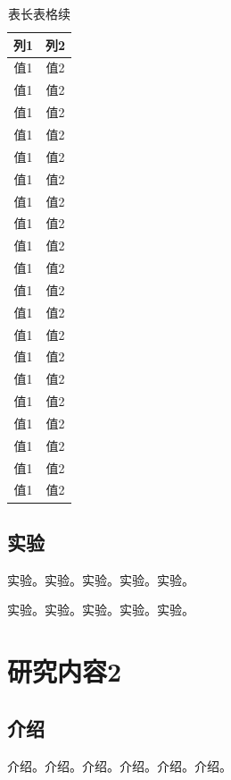 \documentclass{csuthesis}
\begin{document}
    \begin{table}[!t]
        \centering
        \caption*{表\thetable \quad 长表格续}
        \begin{tabular}{c c}
            \toprule[2pt]
            列1 & 列2 \\
            \midrule
            值1 & 值2 \\
            值1 & 值2 \\
            值1 & 值2 \\
            值1 & 值2 \\
            值1 & 值2 \\
            值1 & 值2 \\
            值1 & 值2 \\
            值1 & 值2 \\
            值1 & 值2 \\
            值1 & 值2 \\
            值1 & 值2 \\
            值1 & 值2 \\
            值1 & 值2 \\
            值1 & 值2 \\
            值1 & 值2 \\
            值1 & 值2 \\
            值1 & 值2 \\
            值1 & 值2 \\
            值1 & 值2 \\
            值1 & 值2 \\
            \bottomrule[2pt]
        \end{tabular}
    \end{table}

    \clearpage %

    \section{实验}
    实验。实验。实验。实验。实验。

    实验。实验。实验。实验。实验。
    
    \chapter{研究内容2}
    \thispagestyle{mainstyle} %
    \section{介绍}
    介绍。介绍。介绍。介绍。介绍。介绍。
\end{document}
